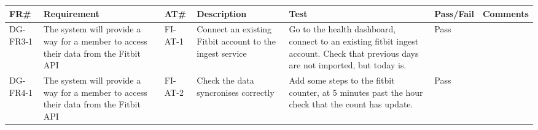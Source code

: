 \begin{longtable}{ |l|p{3cm}|l|p{5cm}|p{5cm}|l|p{6.5cm}|}
\hline
\textbf{FR\#}	&	\textbf{Requirement} & \textbf{AT\#}	&	\textbf{Description} & \textbf{Test} & \textbf{Pass/Fail} &	\textbf{Comments} \\
\hline
\endhead

DG-FR3-1 & The system will provide a way for a member to access their data from the Fitbit API & FI-AT-1 & Connect an existing Fitbit account to the ingest service & Go to the health dashboard, connect to an existing fitbit ingest account. Check that previous days are not imported, but today is. & Pass &  \\ \hline
DG-FR4-1 & The system will provide a way for a member to access their data from the Fitbit API & FI-AT-2 & Check the data syncronises correctly & Add some steps to the fitbit counter, at 5 minutes past the hour check that the count has update. &  Pass & \\ \hline



\end{longtable}